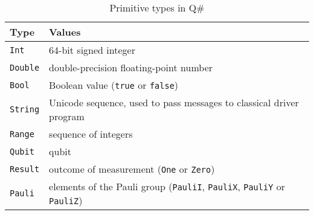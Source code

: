 \begin{table}[!htb]
      \centering
        \begin{tabular}{|l|l|}
        \hline
        Type    & Values \\ 
        \hline
        \texttt{Int}     & 64-bit signed integer \\
        \texttt{Double}  & double-precision floating-point number \\
        \texttt{Bool}    & Boolean value (\texttt{true} or \texttt{false}) \\
        \texttt{String}  & Unicode sequence, used to pass messages to classical driver program\\
        \texttt{Range}   & sequence of integers\\
        \texttt{Qubit}   & qubit\\
        \texttt{Result}  & outcome of measurement (\texttt{One} or \texttt{Zero})\\
        \texttt{Pauli}   & elements of the Pauli group (\texttt{PauliI}, \texttt{PauliX}, \texttt{PauliY} or \texttt{PauliZ})\\
        \hline
    \end{tabular}
    \caption{Primitive types in Q\#}
    \label{table:PrimTypeQsharp}
\end{table}

